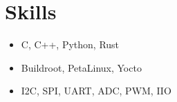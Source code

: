 \section*{Skills}
\begin{itemize}[itemsep=-0.5em]
    \item C, C++, Python, Rust
    \item Buildroot, PetaLinux, Yocto
    \item I2C, SPI, UART, ADC, PWM, IIO
\end{itemize}
